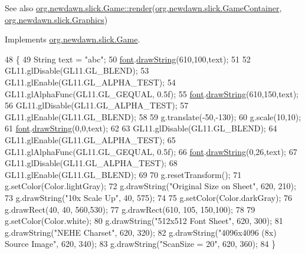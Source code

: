 \begin{DoxySeeAlso}{See also}
\mbox{\hyperlink{interfaceorg_1_1newdawn_1_1slick_1_1_game_af1a4670d43eb3ba04dfcf55ab1975b64}{org.\+newdawn.\+slick.\+Game\+::render}}(\mbox{\hyperlink{classorg_1_1newdawn_1_1slick_1_1_game_container}{org.\+newdawn.\+slick.\+Game\+Container}}, \mbox{\hyperlink{classorg_1_1newdawn_1_1slick_1_1_graphics}{org.\+newdawn.\+slick.\+Graphics}}) 
\end{DoxySeeAlso}


Implements \mbox{\hyperlink{interfaceorg_1_1newdawn_1_1slick_1_1_game_af1a4670d43eb3ba04dfcf55ab1975b64}{org.\+newdawn.\+slick.\+Game}}.


\begin{DoxyCode}
48                                   \{
49         String text = \textcolor{stringliteral}{"abc"};
50         \mbox{\hyperlink{classorg_1_1newdawn_1_1slick_1_1tests_1_1_distance_field_test_aa6d827cd10230d8840d998c885d6103d}{font}}.\mbox{\hyperlink{classorg_1_1newdawn_1_1slick_1_1_angel_code_font_a8cc06c81dd2f11c47844d863a03e3433}{drawString}}(610,100,text);
51         
52         GL11.glDisable(GL11.GL\_BLEND);
53         GL11.glEnable(GL11.GL\_ALPHA\_TEST);
54         GL11.glAlphaFunc(GL11.GL\_GEQUAL, 0.5f);
55         \mbox{\hyperlink{classorg_1_1newdawn_1_1slick_1_1tests_1_1_distance_field_test_aa6d827cd10230d8840d998c885d6103d}{font}}.\mbox{\hyperlink{classorg_1_1newdawn_1_1slick_1_1_angel_code_font_a8cc06c81dd2f11c47844d863a03e3433}{drawString}}(610,150,text);
56         GL11.glDisable(GL11.GL\_ALPHA\_TEST);
57         GL11.glEnable(GL11.GL\_BLEND);
58         
59         g.translate(-50,-130);
60         g.scale(10,10);
61         \mbox{\hyperlink{classorg_1_1newdawn_1_1slick_1_1tests_1_1_distance_field_test_aa6d827cd10230d8840d998c885d6103d}{font}}.\mbox{\hyperlink{classorg_1_1newdawn_1_1slick_1_1_angel_code_font_a8cc06c81dd2f11c47844d863a03e3433}{drawString}}(0,0,text);
62 
63         GL11.glDisable(GL11.GL\_BLEND);
64         GL11.glEnable(GL11.GL\_ALPHA\_TEST);
65         GL11.glAlphaFunc(GL11.GL\_GEQUAL, 0.5f);
66         \mbox{\hyperlink{classorg_1_1newdawn_1_1slick_1_1tests_1_1_distance_field_test_aa6d827cd10230d8840d998c885d6103d}{font}}.\mbox{\hyperlink{classorg_1_1newdawn_1_1slick_1_1_angel_code_font_a8cc06c81dd2f11c47844d863a03e3433}{drawString}}(0,26,text);
67         GL11.glDisable(GL11.GL\_ALPHA\_TEST);
68         GL11.glEnable(GL11.GL\_BLEND);
69         
70         g.resetTransform();
71         g.setColor(Color.lightGray);
72         g.drawString(\textcolor{stringliteral}{"Original Size on Sheet"}, 620, 210);
73         g.drawString(\textcolor{stringliteral}{"10x Scale Up"}, 40, 575);
74         
75         g.setColor(Color.darkGray);
76         g.drawRect(40, 40, 560,530);
77         g.drawRect(610, 105, 150,100);
78 
79         g.setColor(Color.white);
80         g.drawString(\textcolor{stringliteral}{"512x512 Font Sheet"}, 620, 300);
81         g.drawString(\textcolor{stringliteral}{"NEHE Charset"}, 620, 320);
82         g.drawString(\textcolor{stringliteral}{"4096x4096 (8x) Source Image"}, 620, 340);
83         g.drawString(\textcolor{stringliteral}{"ScanSize = 20"}, 620, 360);
84     \}
\end{DoxyCode}
